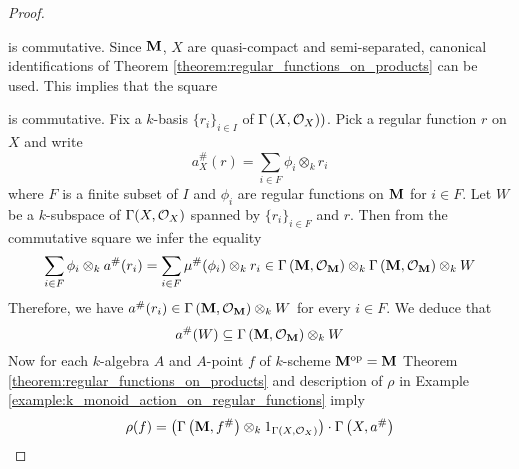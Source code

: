 \begin{proof}
\begin{center}
\begin{tikzpicture}
\end{tikzpicture}
\end{center}
is commutative. Since $\bd{M}$, $X$ are quasi-compact and semi-separated, canonical identifications of Theorem \ref{theorem:regular_functions_on_products} can be used. This implies that the square
\begin{center}
\end{center}
is commutative. Fix a $k$-basis $\{r_i\}_{i\in I}$ of $\Gamma\left(X,\cO_X)\right)$. Pick a regular function $r$ on $X$ and write
$$a^{\#}_X(r) = \sum_{i\in F}\phi_i\otimes_kr_i$$
where $F$ is a finite subset of $I$ and $\phi_i$ are regular functions on $\bd{M}$ for $i\in F$. Let $W$ be a $k$-subspace of $\Gamma(X,\cO_X)$ spanned by $\{r_i\}_{i\in F}$ and $r$. Then from the commutative square we infer the equality
$$\sum_{i\in F}\phi_i\otimes_ka^{\#}(r_i) = \sum_{i\in F}\mu^{\#}(\phi_i)\otimes_kr_i \in \Gamma\left(\bd{M},\cO_{\bd{M}}\right)\otimes_k \Gamma\left(\bd{M},\cO_{\bd{M}}\right) \otimes_k W$$
Therefore, we have $a^{\#}(r_i)\in \Gamma\left(\bd{M},\cO_{\bd{M}}\right)\otimes_kW$ for every $i\in F$. We deduce that
$$a^{\#}(W) \subseteq \Gamma\left(\bd{M},\cO_{\bd{M}}\right)\otimes_kW$$
Now for each $k$-algebra $A$ and $A$-point $f$ of $k$-scheme $\bd{M}^{\mathrm{op}} = \bd{M}$ Theorem \ref{theorem:regular_functions_on_products} and description of $\rho$ in Example \ref{example:k_monoid_action_on_regular_functions} imply
$$\rho(f) =  \big(\Gamma\left(\bd{M},f^{\#}\right)\otimes_k 1_{\Gamma(X,\cO_X)}\big)\cdot \Gamma\left(X,a^{\#}\right)$$

\end{proof}
